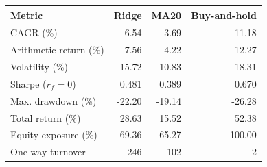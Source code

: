 \begin{tabular}{lrrr}
\toprule
Metric & Ridge & MA20 & Buy-and-hold \\
\midrule
CAGR (\%) & 6.54 & 3.69 & 11.18 \\
Arithmetic return (\%) & 7.56 & 4.22 & 12.27 \\
Volatility (\%) & 15.72 & 10.83 & 18.31 \\
Sharpe ($r_f=0$) & 0.481 & 0.389 & 0.670 \\
Max. drawdown (\%) & -22.20 & -19.14 & -26.28 \\
Total return (\%) & 28.63 & 15.52 & 52.38 \\
Equity exposure (\%) & 69.36 & 65.27 & 100.00 \\
One-way turnover & 246 & 102 & 2 \\
\bottomrule
\end{tabular}
